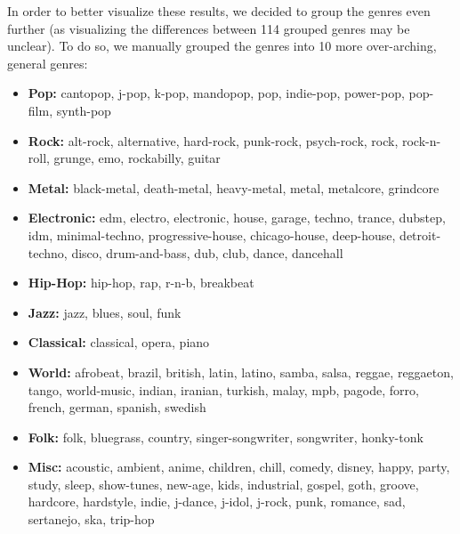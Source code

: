 \documentclass[11pt]{article}
\providecommand{\tightlist}{%
      \setlength{\itemsep}{0pt}\setlength{\parskip}{0pt}}
\begin{document}
    In order to better visualize these results, we decided to group the
genres even further (as visualizing the differences between 114 grouped
genres may be unclear). To do so, we manually grouped the genres into 10
more over-arching, general genres:

\begin{itemize}
\tightlist
\item
  \textbf{Pop:} cantopop, j-pop, k-pop, mandopop, pop, indie-pop,
  power-pop, pop-film, synth-pop\\
\item
  \textbf{Rock:} alt-rock, alternative, hard-rock, punk-rock,
  psych-rock, rock, rock-n-roll, grunge, emo, rockabilly, guitar\\
\item
  \textbf{Metal:} black-metal, death-metal, heavy-metal, metal,
  metalcore, grindcore\\
\item
  \textbf{Electronic:} edm, electro, electronic, house, garage, techno,
  trance, dubstep, idm, minimal-techno, progressive-house,
  chicago-house, deep-house, detroit-techno, disco, drum-and-bass, dub,
  club, dance, dancehall\\
\item
  \textbf{Hip-Hop:} hip-hop, rap, r-n-b, breakbeat\\
\item
  \textbf{Jazz:} jazz, blues, soul, funk\\
\item
  \textbf{Classical:} classical, opera, piano\\
\item
  \textbf{World:} afrobeat, brazil, british, latin, latino, samba,
  salsa, reggae, reggaeton, tango, world-music, indian, iranian,
  turkish, malay, mpb, pagode, forro, french, german, spanish, swedish\\
\item
  \textbf{Folk:} folk, bluegrass, country, singer-songwriter,
  songwriter, honky-tonk\\
\item
  \textbf{Misc:} acoustic, ambient, anime, children, chill, comedy,
  disney, happy, party, study, sleep, show-tunes, new-age, kids,
  industrial, gospel, goth, groove, hardcore, hardstyle, indie, j-dance,
  j-idol, j-rock, punk, romance, sad, sertanejo, ska, trip-hop
\end{itemize}
\end{document}
